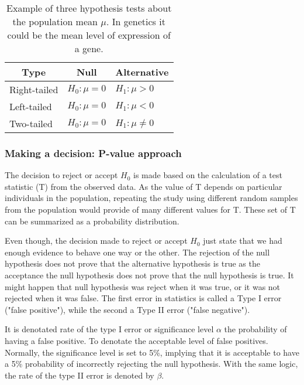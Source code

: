 \begin{table}[h!]
\centering
\caption[Hypothesis tests]{Example of three hypothesis tests about the population mean $\mu$. In genetics it could be the mean level of expression of a gene.}
\label{hypothesis-tests}
\begin{tabular}{@{}lll@{}}
\toprule
\multicolumn{1}{c}{\textbf{Type}} & \multicolumn{1}{c}{\textbf{Null}} & \multicolumn{1}{c}{\textbf{Alternative}} \\ \midrule
Right-tailed & $H_{0}:\mu = 0$ & $H_{1}: \mu >  0 $  \\
Left-tailed & $H_{0}:\mu = 0$ & $H_{1}: \mu <  0 $  \\
Two-tailed & $H_{0}:\mu = 0$ & $H_{1}: \mu \neq 0 $ \\ \bottomrule
\end{tabular}
\end{table}

\subsubsection{Making a decision: P-value approach}

The decision to reject or accept $H_0$ is made based on the calculation of a test statistic (T) from the observed data.
As the value of T depends on particular individuals in the population, repeating the study
using  different random samples from the population would provide of many different values for T.
These set of T can be summarized as a probability distribution.

Even though, the decision made to reject or accept $H_0$ just state that we had
enough evidence to behave one way or the other.
The rejection of the null hypothesis does not prove that the alternative hypothesis is true as
the acceptance the null hypothesis does not prove that the null hypothesis is true.
It might happen that null hypothesis was reject when it was true, or it was not
rejected when it was false. The first error in statistics is called a Type I error ("false positive"),
 while the second a Type II error ("false negative").

It is denotated  rate of the type I error  or significance level $\alpha$ the probability of having a false positive.
To denotate the acceptable level of false positives. Normally, the significance level is set to 5\%,
implying that it is acceptable to have a 5\% probability of incorrectly rejecting the null hypothesis.
With the same logic, the rate of the type II error is denoted by $\beta$.

